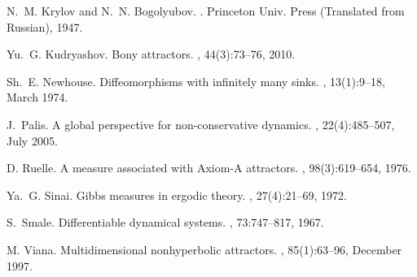 \documentclass[a4paper,12pt]{amsart}
\begin{document}
\begin{thebibliography}{10}
N.~M. Krylov and N.~N. Bogolyubov.
.
\newblock Princeton Univ. Press (Translated from Russian), 1947.

Yu.~G. Kudryashov.
\newblock Bony attractors.
, 44(3):73--76, 2010.

Sh.~E. Newhouse.
\newblock Diffeomorphisms with infinitely many sinks.
, 13(1):9--18, March 1974.

J.~Palis.
\newblock A global perspective for non-conservative dynamics.
, 22(4):485--507, July
  2005.

D. Ruelle.
\newblock A measure associated with {A}xiom-{A} attractors.
, 98(3):619--654, 1976.

Ya.~G. Sinai.
\newblock Gibbs measures in ergodic theory.
, 27(4):21--69, 1972.

S.~Smale.
\newblock Differentiable dynamical systems.
, 73:747--817, 1967.

M. Viana.
\newblock Multidimensional nonhyperbolic attractors.
, 85(1):63--96,
  December 1997.

\end{thebibliography}
\end{document}
